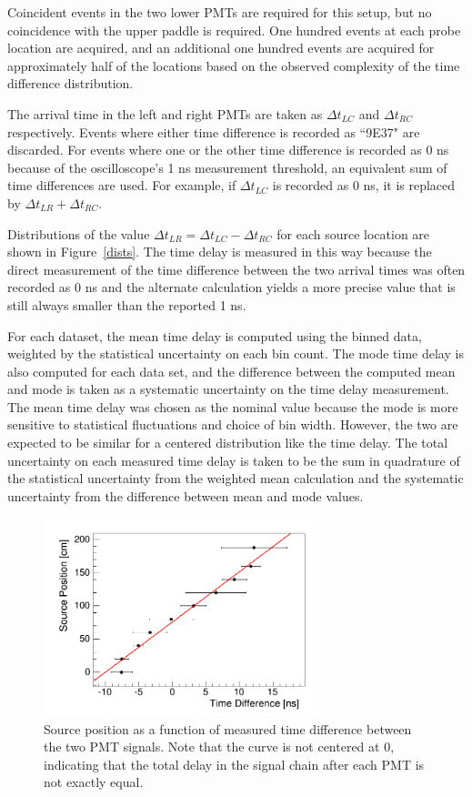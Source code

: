 Coincident events in the two lower PMTs are required for this setup, but no coincidence with the upper paddle is required. One hundred events at each probe location are acquired, and an additional one hundred events are acquired for approximately half of the locations based on the observed complexity of the time difference distribution.

The arrival time in the left and right PMTs are taken as $\Delta t_{LC}$ and $\Delta t_{RC}$ respectively. Events where either time difference is recorded as ``9E37" are discarded. For events where one or the other time difference is recorded as 0 ns because of the oscilloscope's 1 ns measurement threshold, an equivalent sum of time differences are used. For example, if $\Delta t_{LC}$ is recorded as 0 ns, it is replaced by $\Delta t_{LR}+\Delta t_{RC}$.

Distributions of the value $\Delta t_{LR} = \Delta t_{LC} - \Delta t_{RC}$ for each source location are shown in Figure~\ref{dists}. The time delay is measured in this way because the direct measurement of the time difference between the two arrival times was often recorded as 0 ns and the alternate calculation yields a more precise value that is still always smaller than the reported 1 ns. 

For each dataset, the mean time delay is computed using the binned data, weighted by the statistical uncertainty on each bin count. The mode time delay is also computed for each data set, and the difference between the computed mean and mode is taken as a systematic uncertainty on the time delay measurement. The mean time delay was chosen as the nominal value because the mode is more sensitive to statistical fluctuations and choice of bin width. However, the two are expected to be similar for a centered distribution like the time delay. The total uncertainty on each measured time delay is taken to be the sum in quadrature of the statistical uncertainty from the weighted mean calculation and the systematic uncertainty from the difference between mean and mode values. 

\begin{figure}[htb]
\includegraphics[width=8cm]{rad_vel.png}
\caption{Source position as a function of measured time difference between the two PMT signals. Note that the curve is not centered at 0, indicating that the total delay in the signal chain after each PMT is not exactly equal.}
\label{vel}
\end{figure}

